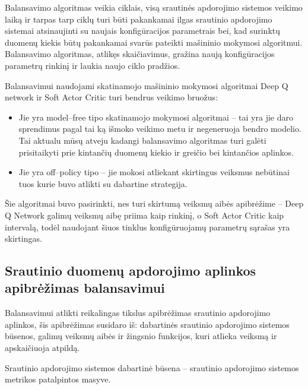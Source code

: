 \documentclass{VUMIFPSbakalaurinis}
\begin{document}
Balansavimo algoritmas veikia ciklais, visą srautinės apdorojimo sistemos veikimo laiką ir tarpas tarp ciklų turi būti pakankamai ilgas srautinio apdorojimo sistemai atsinaujinti su naujais konfigūracijos parametrais bei, kad surinktų duomenų kiekis būtų pakankamai svarūs pateikti mašininio mokymosi algoritmui. Balansavimo algoritmas, atlikęs skaičiavimus, gražina naują konfigūracijos parametrų rinkinį ir laukia naujo ciklo pradžios. 



Balansavimui naudojami skatinamojo mašininio mokymosi algoritmai Deep Q network \cite{fan2020theoretical} ir Soft Actor Critic \cite{haarnoja2019soft} turi bendrus veikimo bruožus:
\begin{itemize}
    \item Jie yra model–free tipo skatinamojo mokymosi algoritmai – tai yra jie daro sprendimus pagal tai ką išmoko veikimo metu ir negeneruoja bendro modelio. Tai aktualu mūsų atveju kadangi balansavimo algoritmas turi galėti prisitaikyti prie kintančių duomenų kiekio ir greičio bei kintančios aplinkos.
    \item Jie yra off–policy tipo – jie mokosi atliekant skirtingus veiksmus nebūtinai tuos kurie buvo atlikti su dabartine strategija.
\end{itemize} 

Šie algoritmai buvo pasirinkti, nes turi skirtumą veiksmų aibės apibrėžime – Deep Q Network galimų veiksmų aibę priima kaip rinkinį, o Soft Actor Critic kaip intervalą, todėl naudojant šiuos tinklus konfigūruojamų parametrų sąrašas yra skirtingas. 

\subsection{Srautinio duomenų apdorojimo aplinkos apibrėžimas balansavimui}

Balansavimui atlikti reikalingas tikslus apibrėžimas srautinio apdorojimo aplinkos, šis apibrėžimas susidaro iš: dabartinės srautinio apdorojimo sistemos būsenos, galimų veiksmų aibės ir žingsnio funkcijos, kuri atlieka veiksmą ir apskaičiuoja atpildą.

Srautinio apdorojimo sistemos dabartinė būsena – srautinio apdorojimo sistemos metrikos patalpintos masyve.
\end{document}
